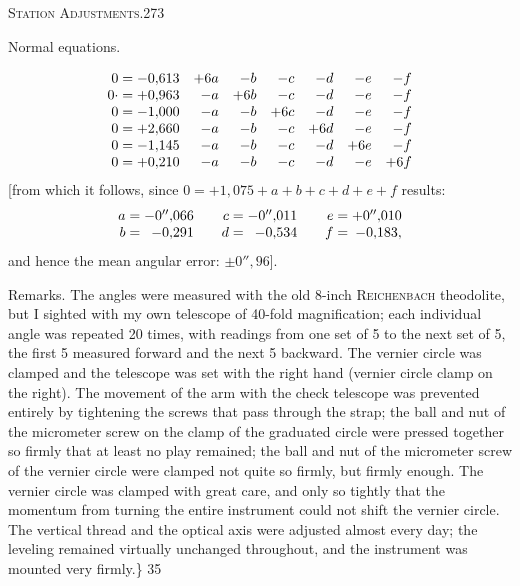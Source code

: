 \clearpage
\noindent\mbox{}\hfill\textsc{Station Adjustments.}\hfill273\par\medskip
\begin{center}Normal equations.\end{center}
\[
\begin{array}{r@{\;}c@{\;}rrrrrrr}
0&=&-0{,}613&+6a&-b&-c&-d&-e&-f\\
0\mathord{\cdot}&=&+0{,}963&-a&+6b&-c&-d&-e&-f\\
0&=&-1{,}000&-a&-b&+6c&-d&-e&-f\\
0&=&+2{,}660&-a&-b&-c&+6d&-e&-f\\
0&=&-1{,}145&-a&-b&-c&-d&+6e&-f\\
0&=&+0{,}210&-a&-b&-c&-d&-e&+6f
\end{array}
\]
[from which it follows, since $0=+1{,}075+a+b+c+d+e+f$ results:
\[
\begin{array}{r@{\;}c@{\;}r@{\qquad}r@{\;}c@{\;}r@{\qquad}r@{\;}c@{\;}r}
a&=&-0''{,}066&c&=&-0''{,}011&e&=&+0''{,}010\\
b&=&-0{,}291&d&=&-0{,}534&f&=&-0{,}183,
\end{array}
\]
and hence the mean angular error: $\pm0''{,}96$].

Remarks. The angles were measured with the old 8-inch \textsc{Reichenbach} theodolite, but I sighted with my own telescope of 40-fold magnification; each individual angle was repeated 20 times, with readings from one set of 5 to the next set of 5, the first 5 measured forward and the next 5 backward. The vernier circle was clamped and the telescope was set with the right hand (vernier circle clamp on the right). The movement of the arm with the check telescope was prevented entirely by tightening the screws that pass through the strap; the ball and nut of the micrometer screw on the clamp of the graduated circle were pressed together so firmly that at least no play remained; the ball and nut of the micrometer screw of the vernier circle were clamped not quite so firmly, but firmly enough. The vernier circle was clamped with great care, and only so tightly that the momentum from turning the entire instrument could not shift the vernier circle. The vertical thread and the optical axis were adjusted almost every day; the leveling remained virtually unchanged throughout, and the instrument was mounted very firmly.\}
\vfill
{}\hfill35

